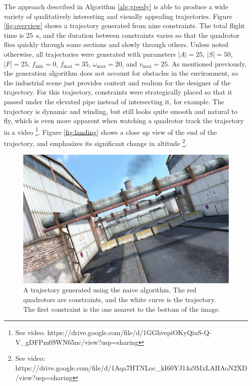 \documentclass[pageno]{jpaper}
\begin{document}
The approach described in Algorithm \ref{alg:greedy} is able to produce a wide variety of qualitatively interesting and visually appealing trajectories. Figure \ref{fig:overview} shows a trajectory generated from nine constraints. The total flight time is \qty{25}{s}, and the duration between constraints varies so that the quadrotor flies quickly through some sections and slowly through others. Unless noted otherwise, all trajectories were generated with parameters $|A| = 25$, $|S| = 50$, $|F| = 25$, $f_{\min} = 0$, $f_{\max} = 35$, $\omega_{\max} = 20$, and $v_{\max} = 25$. As mentioned previously, the generation algorithm does not account for obstacles in the environment, so the industrial scene just provides context and realism for the designer of the trajectory. For this trajectory, constraints were strategically placed so that it passed under the elevated pipe instead of intersecting it, for example. The trajectory is dynamic and winding, but still looks quite smooth and natural to fly, which is even more apparent when watching a quadrotor track the trajectory in a video \footnote{See video: https://drive.google.com/file/d/1GGhvepiOKyQiuS-Q-V\_gDFPm69WN65nc/view?usp=sharing}. Figure \ref{fig:landing} shows a close up view of the end of the trajectory, and emphasizes its significant change in altitude \footnote{See video: https://drive.google.com/file/d/1Aqa7HTNLoc\_kI60YJ14a9MxLAHAoN2XD/view?usp=sharing}.

\begin{figure}[hbt]
  \includegraphics[width=\linewidth]{data/onboard.png}
  \caption{A trajectory generated using the naive algorithm. The red quadrotors are constraints, and the white curve is the trajectory. The first constraint is the one nearest to the bottom of the image.}
  \label{fig:onboard}
\end{figure}
\end{document}

